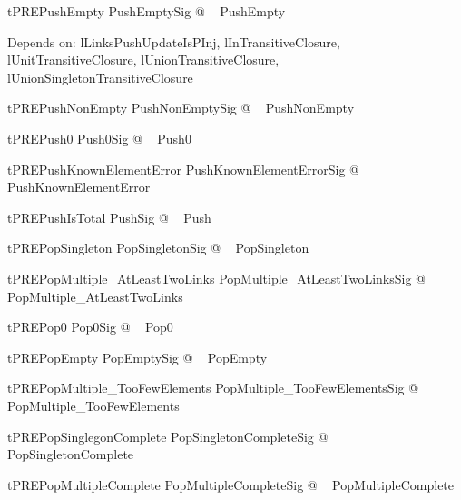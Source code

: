 \begin{theorem}{tPREPushEmpty}
\forall  PushEmptySig @ \pre~  PushEmpty
\end{theorem}


Depends on: lLinksPushUpdateIsPInj, lInTransitiveClosure, lUnitTransitiveClosure,
            lUnionTransitiveClosure, lUnionSingletonTransitiveClosure
\begin{theorem}{tPREPushNonEmpty}
\forall  PushNonEmptySig @ \pre~  PushNonEmpty
\end{theorem}

\begin{theorem}{tPREPush0}
\forall  Push0Sig @ \pre~  Push0
\end{theorem}

\begin{theorem}{tPREPushKnownElementError}
\forall  PushKnownElementErrorSig @ \pre~  PushKnownElementError
\end{theorem}

\begin{theorem}{tPREPushIsTotal}
\forall  PushSig @ \pre~  Push
\end{theorem}

\begin{theorem}{tPREPopSingleton}
\forall  PopSingletonSig @ \pre~  PopSingleton
\end{theorem}

\begin{theorem}{tPREPopMultiple\_AtLeastTwoLinks}
\forall  PopMultiple\_AtLeastTwoLinksSig @ \pre~  PopMultiple\_AtLeastTwoLinks
\end{theorem}

\begin{theorem}{tPREPop0}
\forall  Pop0Sig @ \pre~  Pop0
\end{theorem}

\begin{theorem}{tPREPopEmpty}
\forall  PopEmptySig @ \pre~  PopEmpty
\end{theorem}

\begin{theorem}{tPREPopMultiple\_TooFewElements}
\forall  PopMultiple\_TooFewElementsSig @ \pre~  PopMultiple\_TooFewElements
\end{theorem}

\begin{theorem}{tPREPopSinglegonComplete}
\forall  PopSingletonCompleteSig @ \pre~  PopSingletonComplete
\end{theorem}

\begin{theorem}{tPREPopMultipleComplete}
\forall  PopMultipleCompleteSig @ \pre~  PopMultipleComplete
\end{theorem}

